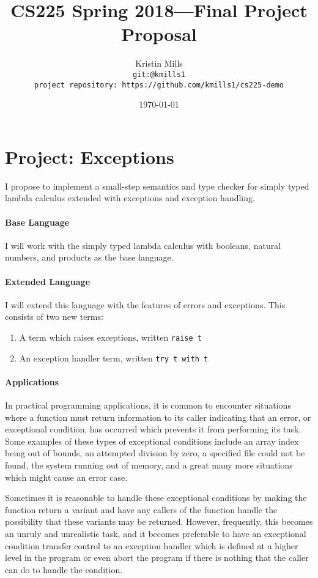 \documentclass{article}
\title{CS225 Spring 2018---Final Project Proposal}
\author{
  Kristin Mills \\ \small{\texttt{git:@kmills1}}\\
\small{\texttt{project repository: https://github.com/kmills1/cs225-demo}}
}
\date{\today}
\begin{document}
\maketitle

\section*{Project: Exceptions}

I propose to implement a small-step semantics and type checker for simply typed lambda calculus extended with exceptions and exception handling.

\paragraph{Base Language}

I will work with the simply typed lambda calculus with booleans, natural numbers, and products as the base language.

\paragraph{Extended Language}

I will extend this language with the features of errors and exceptions. This consists of two new terms:
\begin{enumerate}
\item A term which raises exceptions, written \texttt{raise t}
\item An exception handler term, written \texttt{try t with t}
\end{enumerate}

\paragraph{Applications}

In practical programming applications, it is
common to encounter situations where a function must return information to its caller indicating that an error, or exceptional condition, has occurred which prevents it from performing its task. Some examples of these types of exceptional conditions include an array index being out of bounds, an attempted division by zero, a specified file could not be found, the system running out of memory, and a great many more situations which might cause an error case. 

Sometimes it is reasonable to handle these exceptional conditions by making the function return a variant and have any callers of the function handle the possibility that these variants may be returned. However, frequently, this becomes an unruly and unrealistic task, and it becomes preferable to have an exceptional condition transfer control to an exception handler which is defined at a higher level in the program or even abort the program if there is nothing that the caller can do to handle the condition. 
\end{document}
